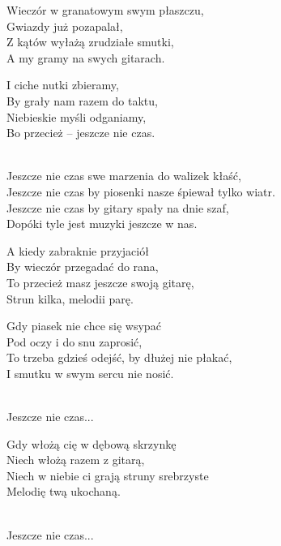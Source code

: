 \begin{text}
    Wieczór w granatowym swym płaszczu,\\
    Gwiazdy już pozapalał,\\
    Z kątów wyłażą zrudziałe smutki,\\
    A my gramy na swych gitarach.

    I ciche nutki zbieramy,\\
    By grały nam razem do taktu,\\
    Niebieskie myśli odganiamy,\\
    Bo przecież – jeszcze nie czas.\\
    ~

    \vin Jeszcze nie czas swe marzenia do walizek kłaść,\\
    \vin Jeszcze nie czas by piosenki nasze śpiewał tylko wiatr.\\
    \vin Jeszcze nie czas by gitary spały na dnie szaf,\\
    \vin Dopóki tyle jest muzyki jeszcze w nas.

    A kiedy zabraknie przyjaciół\\
    By wieczór przegadać do rana,\\
    To przecież masz jeszcze swoją gitarę,\\
    Strun kilka, melodii parę.

    Gdy piasek nie chce się wsypać\\
    Pod oczy i do snu zaprosić,\\
    To trzeba gdzieś odejść, by dłużej nie płakać,\\
    I smutku w swym sercu nie nosić.\\
    ~

    \vin Jeszcze nie czas...

    Gdy włożą cię w dębową skrzynkę\\
    Niech włożą razem z gitarą,\\
    Niech w niebie ci grają struny srebrzyste\\
    Melodię twą ukochaną.\\
    ~

    \vin Jeszcze nie czas...
\end{text}
